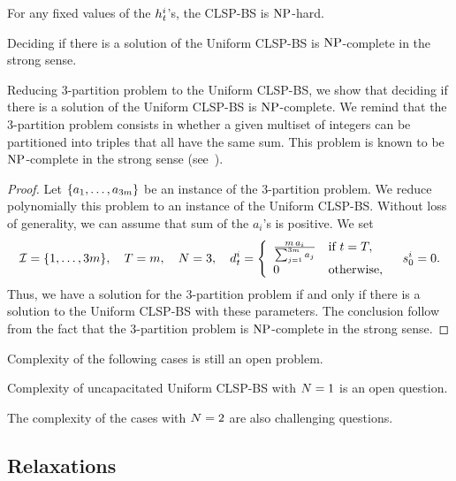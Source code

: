 For any fixed values of the $h_t^i$'s, the CLSP-BS is $\operatorname{NP}$-hard.

\begin{thm}
  Deciding if there is a solution of the Uniform CLSP-BS is $\operatorname{NP}$-complete in the strong sense.
\end{thm}



Reducing 3-partition problem to the Uniform CLSP-BS, we show that deciding if there is a solution of the Uniform CLSP-BS is $\operatorname{NP}$-complete. We remind that the 3-partition problem consists in whether a given multiset of integers can be partitioned into triples that all have the same sum. This problem is known to be $\operatorname{NP}$-complete in the strong sense (see~\cite{Garey1979}).



\begin{proof}
Let $\crbracket{a_1,\ldots,a_{3m}}$ be an instance of the 3-partition problem.
We reduce polynomially this problem to an instance of the Uniform CLSP-BS.
Without loss of generality, we can assume that sum of the $a_i$'s is positive.
We set
\begin{equation}
  \REF=\range[1]{3m}
  ,\quad
  \horizon=m
  ,\quad
  \nbsetups=3
  ,\quad
  \demand_t^i
  =\left\{
  \begin{array}{ll}
  \frac{m\,a_i}{\sum_{j=1}^{3m}a_j} & \mbox{if}\ t=\horizon,
  \\
  0 & \mbox{otherwise,}\end{array}
  \right.
  \quad
  \inventory_0^i=0.
\end{equation}
Thus, we have a solution for the 3-partition problem if and only if there is a solution to the Uniform CLSP-BS with these parameters. The conclusion follow from the fact that the 3-partition problem is $\operatorname{NP}$-complete in the strong sense.
\end{proof}


Complexity of the following cases is still an open problem.
\begin{question}
Complexity of uncapacitated Uniform CLSP-BS with $N=1$ is an open question.
\end{question}

The complexity of the cases with $N=2$ are also challenging questions.




\subsection{Relaxations}
\label{sec:PDP:deterministic:theoretical-results:continuous-relaxation}

